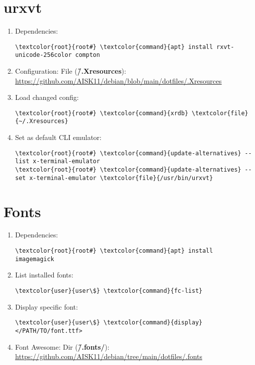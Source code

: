 \documentclass[10pt, a4paper, onecolumn, openany]{book} %
\begin{document}
\section{urxvt}
\begin{enumerate}
    \item Dependencies:
\begin{Verbatim}[commandchars=\\\{\}]
\textcolor{root}{root#} \textcolor{command}{apt} install rxvt-unicode-256color compton
\end{Verbatim}
    \item Configuration:
\newline File (\textbf{\textcolor{file}{\~/.Xresources}}):
\newline \underline{\url{https://github.com/AISK11/debian/blob/main/dotfiles/.Xresources}}
    \item Load changed config:
\begin{Verbatim}[commandchars=\\\{\}]
\textcolor{root}{root#} \textcolor{command}{xrdb} \textcolor{file}{~/.Xresources}
\end{Verbatim}
    \item Set as default CLI emulator:
\begin{Verbatim}[commandchars=\\\{\}]
\textcolor{root}{root#} \textcolor{command}{update-alternatives} --list x-terminal-emulator
\textcolor{root}{root#} \textcolor{command}{update-alternatives} --set x-terminal-emulator \textcolor{file}{/usr/bin/urxvt}
\end{Verbatim}
\end{enumerate}
\section{Fonts}
\begin{enumerate}
    \item Dependencies:
\begin{Verbatim}[commandchars=\\\{\}]
\textcolor{root}{root#} \textcolor{command}{apt} install imagemagick
\end{Verbatim}
    \item List installed fonts:
\begin{Verbatim}[commandchars=\\\{\}]
\textcolor{user}{user\$} \textcolor{command}{fc-list}
\end{Verbatim}
    \item Display specific font:
\begin{Verbatim}[commandchars=\\\{\}]
\textcolor{user}{user\$} \textcolor{command}{display} </PATH/TO/font.ttf>
\end{Verbatim}
    \item Font Awesome:
\newline Dir (\textbf{\textcolor{dir}{\~/.fonts/}}):
\newline \underline{\url{https://github.com/AISK11/debian/tree/main/dotfiles/.fonts}}
\end{enumerate}
\end{document}
